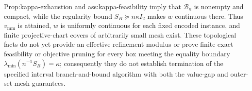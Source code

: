 Prop:kappa-exhaustion and ass:kappa-feasibility imply that \(\mathcal B_\kappa\) is nonempty and compact, while the regularity bound \(S_B\succeq n\kappa I_2\) makes \(w\) continuous there.  Thus \(v_{\mathrm{mm}}\) is attained, \(w\) is uniformly continuous for each fixed encoded instance, and finite projective-chart covers of arbitrarily small mesh exist.  These topological facts do not yet provide an effective refinement modulus or prove finite exact feasibility or objective pruning for every box meeting the equality boundary \(\lambda_{\min}(n^{-1}S_B)=\kappa\); consequently they do not establish termination of the specified interval branch-and-bound algorithm with both the value-gap and outer-set mesh guarantees.
